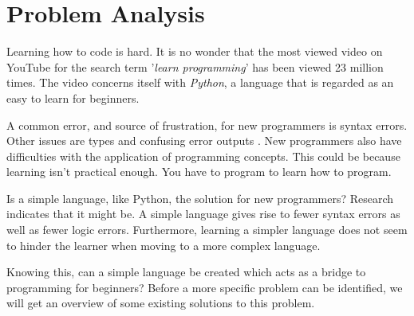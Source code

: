 \chapter{Problem Analysis} \label{chap:analysis}
Learning how to code is hard.
It is no wonder that the most viewed video on YouTube for the search term '\textit{learn programming}' has been viewed 23 million times\cite{LearnProgrammingYouTube}.
The video concerns itself with \textit{Python}, a language that is regarded as an easy to learn for beginners\cite{PythonBeginners}.

A common error, and source of frustration, for new programmers is syntax errors.
Other issues are types and confusing error outputs \cite{bosseWhyProgrammingDifficult2017}.
New programmers also have difficulties with the application of programming concepts.
This could be because learning isn't practical enough\cite{lahtinenStudyDifficultiesNovice2005}.
You have to program to learn how to program.

Is a simple language, like Python\cite{WhatPythonExecutive}, the solution for new programmers?
Research indicates that it might be. A simple language gives rise to fewer syntax errors as well as fewer logic errors.
Furthermore, learning a simpler language does not seem to hinder the learner when moving to a more complex language\cite{mannilaWhatSimpleLanguage2006}.


Knowing this, can a simple language be created which acts as a bridge to programming for beginners?
Before a more specific problem can be identified, we will get an overview of some existing solutions to this problem.


